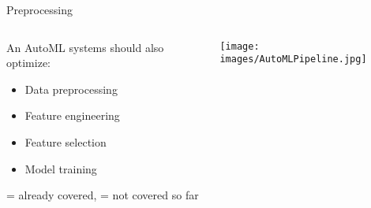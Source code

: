 

\usepackage[normalem]{ulem}
\usepackage{pifont}
\usepackage{relsize}
\renewcommand{\lit}[1]{{\smaller\color{black!60}[#1]}}
\subtitle{Preprocessing}



	
	\maketitle
	
	\begin{frame}[c]{Preprocessing}
		\begin{columns}
			\begin{column}{0.5\textwidth} 
				An AutoML systems should also optimize: 
				\begin{itemize}
					\item[\ding{55}] Data preprocessing
					\item[\ding{55}] Feature engineering
					\item[\ding{55}] Feature selection
					\item[\ding{51}] Model training
				\end{itemize}
				\vspace{1em}
				{\tiny {} = already covered,  = not covered so far}
			\end{column}%
			\begin{column}{0.5\textwidth}
				\begin{center}
					\texttt{[image: images/AutoMLPipeline.jpg]}  
				\end{center}
			\end{column}
		\end{columns}
		
	\end{frame}
	
